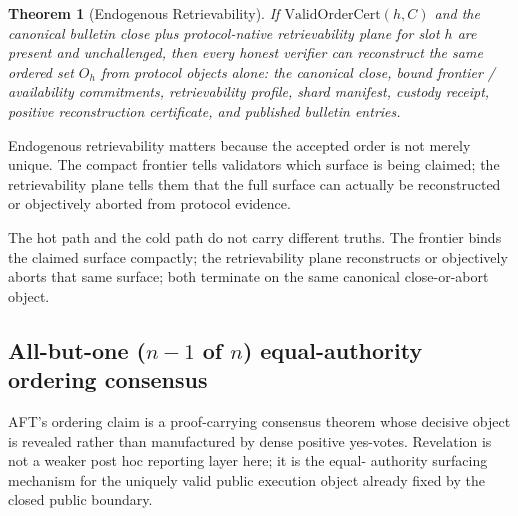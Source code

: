\documentclass[11pt]{article}
\newtheorem{theorem}{Theorem}
\newcommand{\AFT}{\textsc{AFT}}
\begin{document}
\begin{theorem}[Endogenous Retrievability]
If \(\mathrm{ValidOrderCert}(h, C)\) and the canonical bulletin close plus
protocol-native retrievability plane for slot \(h\) are present and
unchallenged, then every honest verifier can reconstruct the same ordered set
\(O_h\) from protocol objects alone: the canonical close, bound frontier /
availability commitments, retrievability profile, shard manifest, custody
receipt, positive reconstruction certificate, and published bulletin entries.
\end{theorem}

Endogenous retrievability matters because the accepted order is not merely
unique. The compact frontier tells validators which surface is being claimed;
the retrievability plane tells them that the full surface can actually be
reconstructed or objectively aborted from protocol evidence.

The hot path and the cold path do not carry different truths. The frontier
binds the claimed surface compactly; the retrievability plane reconstructs or
objectively aborts that same surface; both terminate on the same canonical
close-or-abort object.

\subsection{\texorpdfstring{All-but-one (\(n-1\) of \(n\))}{All-but-one (n-1 of n)} equal-authority ordering consensus}

\AFT{}'s ordering claim is a proof-carrying consensus theorem whose decisive
object is revealed rather than manufactured by dense positive yes-votes.
Revelation is not a weaker post hoc reporting layer here; it is the equal-
authority surfacing mechanism for the uniquely valid public execution object
already fixed by the closed public boundary.
\end{document}
